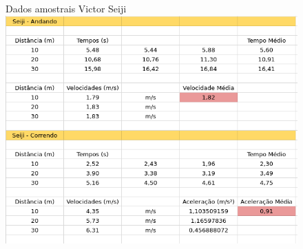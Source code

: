 \documentclass[a4paper, 12pt]{article}
\begin{document}
    \begin{figure}[h]
    \centering
    Dados amostrais Victor Seiji 
    \includegraphics[scale=0.45]{Seiji.png}
    \end{figure}
\end{document}
